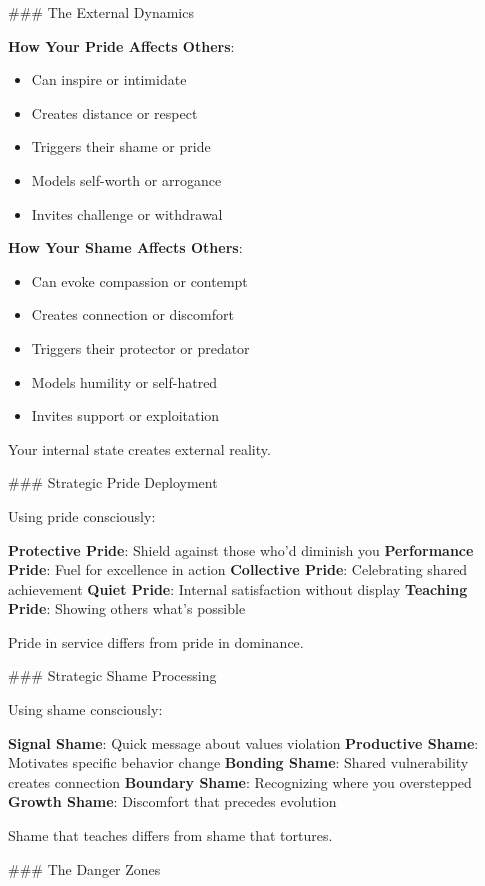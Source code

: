 \documentclass[12pt]{book}
\begin{document}
\#\#\# The External Dynamics

\textbf{How Your Pride Affects Others}:
\begin{itemize}
\item Can inspire or intimidate
\item Creates distance or respect
\item Triggers their shame or pride
\item Models self-worth or arrogance
\item Invites challenge or withdrawal

\end{itemize}
\textbf{How Your Shame Affects Others}:
\begin{itemize}
\item Can evoke compassion or contempt
\item Creates connection or discomfort
\item Triggers their protector or predator
\item Models humility or self-hatred
\item Invites support or exploitation

\end{itemize}
Your internal state creates external reality.

\#\#\# Strategic Pride Deployment

Using pride consciously:

\textbf{Protective Pride}: Shield against those who'd diminish you
\textbf{Performance Pride}: Fuel for excellence in action
\textbf{Collective Pride}: Celebrating shared achievement
\textbf{Quiet Pride}: Internal satisfaction without display
\textbf{Teaching Pride}: Showing others what's possible

Pride in service differs from pride in dominance.

\#\#\# Strategic Shame Processing

Using shame consciously:

\textbf{Signal Shame}: Quick message about values violation
\textbf{Productive Shame}: Motivates specific behavior change
\textbf{Bonding Shame}: Shared vulnerability creates connection
\textbf{Boundary Shame}: Recognizing where you overstepped
\textbf{Growth Shame}: Discomfort that precedes evolution

Shame that teaches differs from shame that tortures.

\#\#\# The Danger Zones
\end{document}
